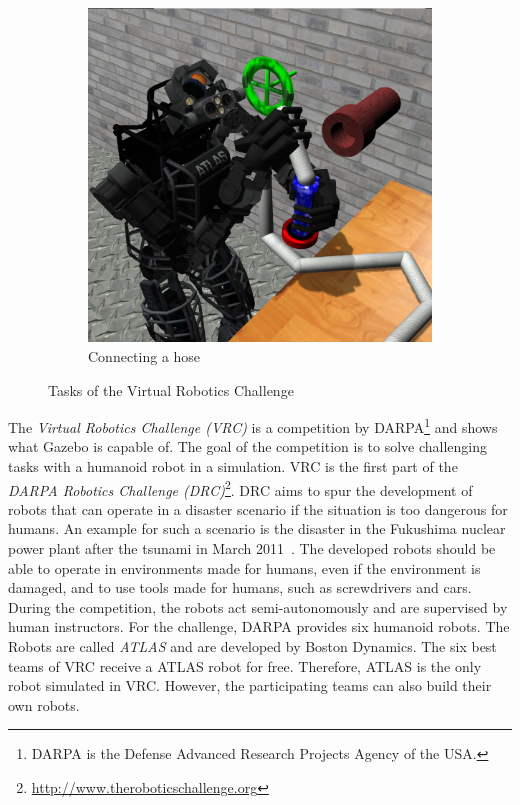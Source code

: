 \begin{figure}
\begin{subfigure}[b]{0.3\textwidth}
    \label{fig:vrc_walking}
  \end{subfigure}
  \begin{subfigure}[b]{0.3\textwidth}
    \includegraphics[width=\textwidth]{pics/darpa_hose}
    \caption{Connecting a hose}
    \label{fig:vrc_hose}
  \end{subfigure}
  \caption{Tasks of the Virtual Robotics Challenge~\cite{vrc_pics}}
  \label{fig:vrc}
\end{figure}
The \textit{Virtual Robotics Challenge (VRC)} is a competition by DARPA\footnote{DARPA is the Defense Advanced Research Projects Agency of the USA.} and shows what Gazebo is capable of. The goal of the competition is to solve challenging tasks with a humanoid robot in a simulation. VRC is the first part of the \textit{DARPA Robotics Challenge (DRC)}\footnote{\url{http://www.theroboticschallenge.org}}. DRC aims to spur the development of robots that can operate in a disaster scenario if the situation is too dangerous for humans. An example for such a scenario is the disaster in the Fukushima nuclear power plant after the tsunami in March 2011~\cite{fukushima}. The developed robots should be able to operate in environments made for humans, even if the environment is damaged, and to use tools made for humans, such as screwdrivers and cars. During the competition, the robots act semi-autonomously and are supervised by human instructors. For the challenge, DARPA provides six humanoid robots. The Robots are called \textit{ATLAS} and are developed by Boston Dynamics. The six best teams of VRC receive a ATLAS robot for free. Therefore, ATLAS is the only robot simulated in VRC. However, the participating teams can also build their own robots.
